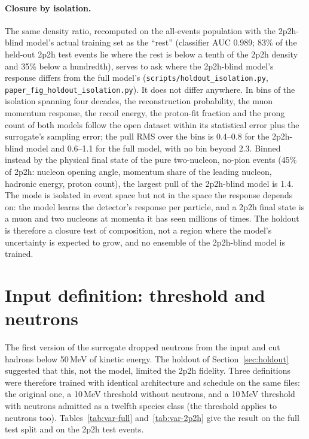 \documentclass[11pt]{article}
\begin{document}
\paragraph{Closure by isolation.} The same density ratio, recomputed on the all-events population with the
2p2h-blind model's actual training set as the ``rest'' (classifier AUC 0.989; 83\% of the held-out 2p2h test
events lie where the rest is below a tenth of the 2p2h density and 35\% below a hundredth), serves to ask where
the 2p2h-blind model's response differs from the full model's (\texttt{scripts/holdout\_isolation.py},
\texttt{paper\_fig\_holdout\_isolation.py}). It does not differ anywhere. In bins of the isolation spanning four
decades, the reconstruction probability, the muon momentum response, the recoil energy, the proton-fit fraction and
the prong count of both models follow the open dataset within its statistical error plus the surrogate's sampling
error; the pull RMS over the bins is 0.4--0.8 for the 2p2h-blind model and 0.6--1.1 for the full model, with no
bin beyond 2.3. Binned instead by the physical final state of the pure two-nucleon, no-pion events (45\% of
2p2h: nucleon opening angle, momentum share of the leading nucleon, hadronic energy, proton count), the largest
pull of the 2p2h-blind model is 1.4. The mode is isolated in event space but not in the space the response
depends on: the model learns the detector's response per particle, and a 2p2h final state is a muon and two
nucleons at momenta it has seen millions of times. The holdout is therefore a closure test of composition, not a
region where the model's uncertainty is expected to grow, and no ensemble of the 2p2h-blind model is trained.

\section{Input definition: threshold and neutrons}
\label{sec:inputdef}

The first version of the surrogate dropped neutrons from the input and cut hadrons below 50\,MeV of kinetic
energy. The holdout of Section~\ref{sec:holdout} suggested that this, not the model, limited the 2p2h fidelity.
Three definitions were therefore trained with identical architecture and schedule on the same files: the original
one, a 10\,MeV threshold without neutrons, and a 10\,MeV threshold with neutrons admitted as a twelfth species
class (the threshold applies to neutrons too). Tables~\ref{tab:var-full} and~\ref{tab:var-2p2h} give the result on
the full test split and on the 2p2h test events.
\end{document}
